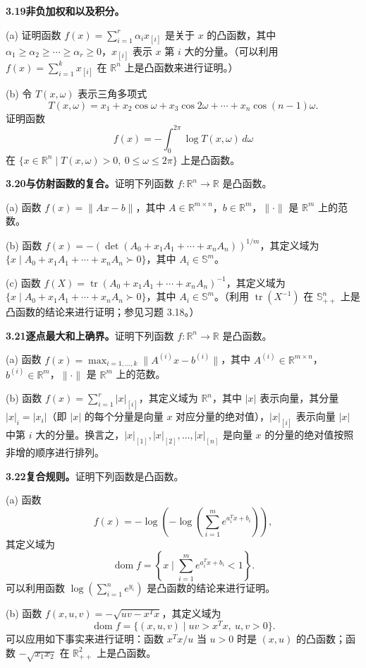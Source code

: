 \documentclass[UTF8,12pt,a4paper,fontset=fandol]{ctexart}
\DeclareMathOperator{\dom}{dom}
\begin{document}
\noindent\textbf{3.19\quad 非负加权和以及积分。}

(a) 证明函数 $f(x)=\sum_{i=1}^r\alpha_i x_{[i]}$ 是关于 $x$ 的凸函数，其中 $\alpha_1\geq\alpha_2\geq\cdots\geq\alpha_r\geq0$，$x_{[i]}$ 表示 $x$ 第 $i$ 大的分量。（可以利用 $f(x)=\sum_{i=1}^k x_{[i]}$ 在 $\mathbb{R}^n$ 上是凸函数来进行证明。）

(b) 令 $T(x,\omega)$ 表示三角多项式
\[
T(x,\omega)=x_1+x_2\cos\omega+x_3\cos2\omega+\cdots+x_n\cos(n-1)\omega.
\]
证明函数
\[
f(x)=-\int_0^{2\pi}\log T(x,\omega)\,d\omega
\]
在 $\{x\in\mathbb{R}^n\mid T(x,\omega)>0,\ 0\leq\omega\leq2\pi\}$ 上是凸函数。

\noindent\textbf{3.20\quad 与仿射函数的复合。}\quad 证明下列函数 $f:\mathbb{R}^n\to\mathbb{R}$ 是凸函数。

(a) 函数 $f(x)=\|Ax-b\|$，其中 $A\in\mathbb{R}^{m\times n}$，$b\in\mathbb{R}^m$，$\|\cdot\|$ 是 $\mathbb{R}^m$ 上的范数。

(b) 函数 $f(x)=-(\det(A_0+x_1A_1+\cdots+x_nA_n))^{1/m}$，其定义域为 $\{x\mid A_0+x_1A_1+\cdots+x_nA_n\succ0\}$，其中 $A_i\in\mathbb{S}^m$。

(c) 函数 $f(X)=\operatorname{tr}(A_0+x_1A_1+\cdots+x_nA_n)^{-1}$，其定义域为 $\{x\mid A_0+x_1A_1+\cdots+x_nA_n\succ0\}$，其中 $A_i\in\mathbb{S}^m$。（利用 $\operatorname{tr}(X^{-1})$ 在 $\mathbb{S}_{++}^n$ 上是凸函数的结论来进行证明；参见习题 3.18。）

\noindent\textbf{3.21\quad 逐点最大和上确界。}\quad 证明下列函数 $f:\mathbb{R}^n\to\mathbb{R}$ 是凸函数。

(a) 函数 $f(x)=\max_{i=1,\ldots,k}\|A^{(i)}x-b^{(i)}\|$，其中 $A^{(i)}\in\mathbb{R}^{m\times n}$，$b^{(i)}\in\mathbb{R}^m$，$\|\cdot\|$ 是 $\mathbb{R}^m$ 上的范数。

(b) 函数 $f(x)=\sum_{i=1}^r |x|_{[i]}$，其定义域为 $\mathbb{R}^n$，其中 $|x|$ 表示向量，其分量 $|x|_i=|x_i|$（即 $|x|$ 的每个分量是向量 $x$ 对应分量的绝对值），$|x|_{[i]}$ 表示向量 $|x|$ 中第 $i$ 大的分量。换言之，$|x|_{[1]},|x|_{[2]},\ldots,|x|_{[n]}$ 是向量 $x$ 的分量的绝对值按照非增的顺序进行排列。

\noindent\textbf{3.22\quad 复合规则。}\quad 证明下列函数是凸函数。

(a) 函数
\[
f(x)=-\log\left(-\log\left(\sum_{i=1}^m e^{a_i^Tx+b_i}\right)\right),
\]
其定义域为
\[
\dom f=\left\{x\mid \sum_{i=1}^m e^{a_i^Tx+b_i}<1\right\}.
\]
可以利用函数 $\log\left(\sum_{i=1}^n e^{y_i}\right)$ 是凸函数的结论来进行证明。

(b) 函数 $f(x,u,v)=-\sqrt{uv-x^Tx}$，其定义域为
\[
\dom f=\{(x,u,v)\mid uv>x^Tx,\ u,v>0\}.
\]
可以应用如下事实来进行证明：函数 $x^Tx/u$ 当 $u>0$ 时是 $(x,u)$ 的凸函数；函数 $-\sqrt{x_1x_2}$ 在 $\mathbb{R}_{++}^2$ 上是凸函数。
\end{document}
